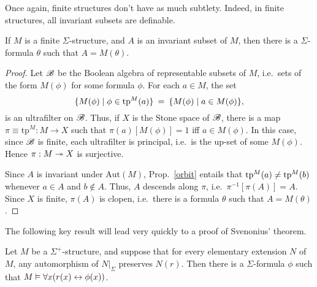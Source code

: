 Once again, finite structures don't have as much subtlety.  Indeed, in
finite structures, all invariant subsets are definable.

\begin{thm} If $M$ is a finite
  $\Sigma$-structure, and $A$ is an invariant subset of $M$, then
  there is a $\Sigma$-formula $\theta$ such that $A=M (\theta
  )$.  \end{thm}

\begin{proof} Let $\mathscr B$ be the Boolean algebra of representable
  subsets of $M$, i.e.\ sets of the form $M(\phi )$ for some formula
  $\phi$.  For each $a\in M$, the set
  \[ \{ M(\phi )\mid \phi \in \mathrm{tp}^{M}(a) \} \: = \: \{ M(\phi )\mid
    a\in M(\phi ) \} ,\] is an ultrafilter on $\mathscr B$.  Thus, if $X$ is
  the Stone space of $\mathscr B$, there is a map
  $\pi \equiv \mathrm{tp}^M:M\to X$ such that $\pi (a)[M(\phi )]=1$
  iff $a\in M(\phi )$.  In this case, since $\mathscr B$ is finite, each
  ultrafilter is principal, i.e.\ is the up-set of some $M(\phi )$.
  Hence $\pi :M\twoheadrightarrow X$ is surjective.

  Since $A$ is invariant under $\mathrm{Aut}(M)$, Prop.\ \ref{orbit}
  entails that $\mathrm{tp}^{M}(a)\neq \mathrm{tp}^{M}(b)$ whenever $a\in A$ and
  $b\not\in A$.  Thus, $A$ descends along $\pi$, i.e.\
  $\pi ^{-1}[\pi (A)]=A$.  Since $X$ is finite, $\pi (A)$ is clopen,
  i.e.\ there is a formula $\theta$ such that $A=M(\theta )$.
\end{proof}

The following key result will lead very quickly to a proof of
Svenonius' theorem.

\begin{prop} Let $M$ be a $\Sigma ^+$-structure, and suppose that for
  every elementary extension $N$ of $M$, any automorphism of
  $N|_\Sigma$ preserves $N(r)$.  Then there is a $\Sigma$-formula
  $\phi$ such that $M\vDash \forall x(r(x)\leftrightarrow \phi (x))$.  \end{prop}

